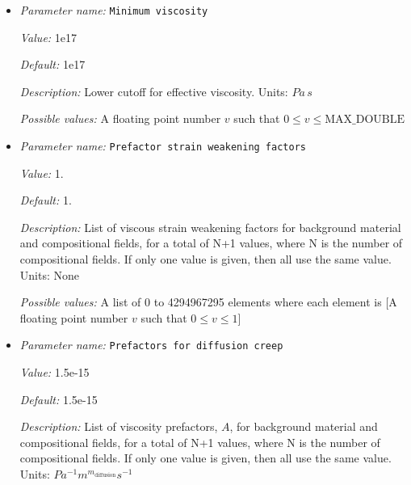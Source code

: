 \begin{itemize}
{\it Description:} Stabilizes strain dependent viscosity. Units: $1 / s$


{\it Possible values:} A floating point number $v$ such that $0 \leq v \leq \text{MAX\_DOUBLE}$
\item {\it Parameter name:} {\tt Minimum viscosity}
\label{parameters:Material model/Visco Plastic/Minimum viscosity}


{\it Value:} 1e17


{\it Default:} 1e17


{\it Description:} Lower cutoff for effective viscosity. Units: $Pa \, s$


{\it Possible values:} A floating point number $v$ such that $0 \leq v \leq \text{MAX\_DOUBLE}$
\item {\it Parameter name:} {\tt Prefactor strain weakening factors}
\label{parameters:Material model/Visco Plastic/Prefactor strain weakening factors}


{\it Value:} 1.


{\it Default:} 1.


{\it Description:} List of viscous strain weakening factors for background material and compositional fields, for a total of N+1 values, where N is the number of compositional fields. If only one value is given, then all use the same value.  Units: None


{\it Possible values:} A list of 0 to 4294967295 elements where each element is [A floating point number $v$ such that $0 \leq v \leq 1$]
\item {\it Parameter name:} {\tt Prefactors for diffusion creep}
\label{parameters:Material model/Visco Plastic/Prefactors for diffusion creep}


{\it Value:} 1.5e-15


{\it Default:} 1.5e-15


{\it Description:} List of viscosity prefactors, $A$, for background material and compositional fields, for a total of N+1 values, where N is the number of compositional fields. If only one value is given, then all use the same value. Units: $Pa^{-1} m^{m_{\text{diffusion}}} s^{-1}$



\end{itemize}
